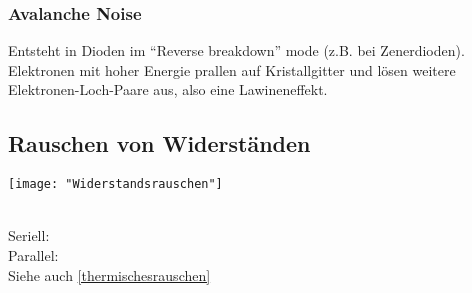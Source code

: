 
\subsubsection{Avalanche Noise}
Entsteht in Dioden im “Reverse breakdown” mode (z.B. bei Zenerdioden).
Elektronen mit hoher Energie prallen auf Kristallgitter und lösen weitere Elektronen-Loch-Paare aus, also eine Lawineneffekt.



\subsection{Rauschen von Widerständen} \label{rauschenvonwiderständen}

\begin{minipage}[t]{0.3\textwidth}
	\vspace{0pt}
	\texttt{[image: "Widerstandsrauschen"]}
\end{minipage}\hspace{0.05\textwidth}
\begin{minipage}[t]{0.3\textwidth}
	\vspace{0pt}
	\\
	
	Seriell: \\
	Parallel: \\
	
	Siehe auch \ref{thermischesrauschen}
\end{minipage}\hspace{0.05\textwidth}
\begin{minipage}[t]{0.3\textwidth}
	\\
	\\
	\\
	\\
	\\
	\\
	\\
	\\
	\\
\end{minipage}
\vspace{2mm}

